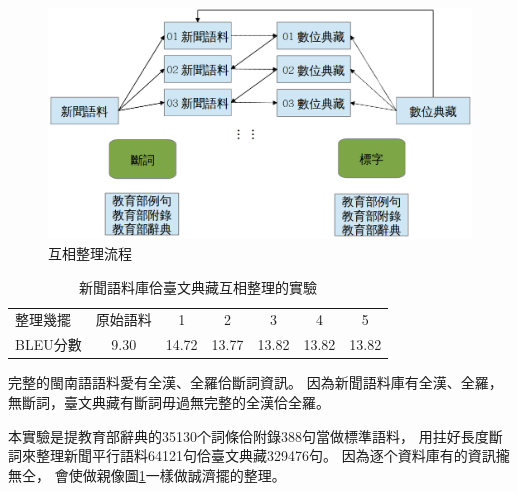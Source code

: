 \begin{figure}
\centerline{\includegraphics[keepaspectratio,width=40em]{圖/互相整理架構}}
\caption{互相整理流程}
\label{圖：互相整理架構}
\end{figure}

\begin{table}
\caption{新聞語料庫佮臺文典藏互相整理的實驗}
\label{表：互相整理實驗}
\centering
\begin{tabular}{lcccccc}
整理幾擺 & 原始語料 & 1 & 2 & 3 & 4 & 5\\
BLEU分數 & 9.30 & 14.72 & 13.77 & 13.82 & 13.82 & 13.82\\
\end{tabular}
\end{table}



完整的閩南語語料愛有全漢、全羅佮斷詞資訊。
因為新聞語料庫有全漢、全羅，無斷詞，臺文典藏有斷詞毋過無完整的全漢佮全羅。


本實驗是提教育部辭典的35130个詞條佮附錄388句當做標準語料，
用拄好長度斷詞來整理新聞平行語料64121句佮臺文典藏329476句。
因為逐个資料庫有的資訊攏無仝，
會使做親像圖\ref{圖：互相整理架構}一樣做誠濟擺的整理。


